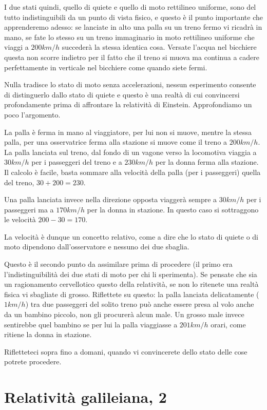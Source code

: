 I due stati quindi, quello di quiete e quello di moto rettilineo uniforme, sono del tutto indistinguibili da un punto di vista fisico, e questo è il punto importante che apprenderemo adesso: se lanciate in alto una palla su un treno fermo vi ricadrà in mano, se fate lo stesso su un treno immaginario in moto rettilineo uniforme che viaggi a $200 km/h$ succederà la stessa identica cosa. Versate l’acqua nel bicchiere questa non scorre indietro per il fatto che il treno si muova ma continua a cadere perfettamente in verticale nel bicchiere come quando siete fermi.

Nulla tradisce lo stato di moto senza accelerazioni, nessun esperimento consente di distinguerlo dallo stato di quiete  e questo è una realtà di cui convincersi profondamente prima di affrontare la relatività di Einstein. Approfondiamo un poco l'argomento.

La palla è ferma in mano al viaggiatore, per lui non si muove, mentre la stessa palla, per una osservatrice ferma alla stazione si muove come il treno a $200 km/h$. La palla lanciata sul treno, dal fondo di un vagone verso la locomotiva viaggia a $30 km/h$ per i passeggeri del treno e a $230 km/h$ per la donna ferma alla stazione. Il calcolo è facile, basta sommare alla velocità della palla (per i passeggeri) quella del treno, $30+200=230$. 

Una palla lanciata invece nella direzione opposta viaggerà sempre a $30 km/h$ per i passeggeri ma a $170 km/h$ per la donna in stazione. In questo caso si sottraggono le velocità $200-30=170$.

La velocità è dunque un concetto relativo, come a dire che lo stato di quiete o di moto dipendono dall’osservatore e nessuno dei due sbaglia. 

Questo è il secondo punto da assimilare prima di procedere (il primo era l'indistinguibilità dei due stati di moto per chi li sperimenta). Se pensate che sia un ragionamento cervellotico questo della relatività, se non lo ritenete una realtà fisica vi sbagliate di grosso. Riflettete su questo: la palla lanciata delicatamente ($1 km/h$) tra due passeggeri del solito treno può anche essere presa al volo anche da un bambino piccolo, non gli procurerà alcun male. Un grosso male invece  sentirebbe quel bambino se  per lui la palla viaggiasse a $201 km/h$ orari, come ritiene la donna in stazione.

Rifletteteci sopra fino a domani, quando vi convincerete dello stato delle cose potrete procedere.

\section{Relatività galileiana, 2}

